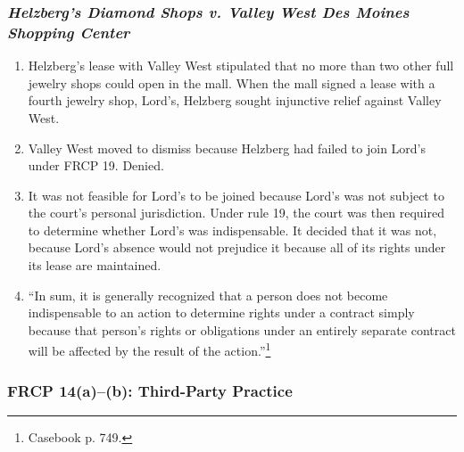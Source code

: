\subsubsection{\emph{Helzberg's Diamond Shops v. Valley West Des Moines Shopping Center}}

\begin{enumerate}
    \item Helzberg's lease with Valley West stipulated that no more than two other full jewelry shops could open in the mall. When the mall signed a lease with a fourth jewelry shop, Lord's, Helzberg sought injunctive relief against Valley West.
    \item Valley West moved to dismiss because Helzberg had failed to join Lord's under FRCP 19. Denied.
    \item It was not feasible for Lord's to be joined because Lord's was not subject to the court's personal jurisdiction. Under rule 19, the court was then required to determine whether Lord's was indispensable. It decided that it was not, because Lord's absence would not prejudice it because all of its rights under its lease are maintained.
    \item ``In sum, it is generally recognized that a person does not become indispensable to an action to determine rights under a contract simply because that person's rights or obligations under an entirely separate contract will be affected by the result of the action.''\footnote{Casebook p. 749.}
\end{enumerate}

\subsubsection{FRCP 14(a)--(b): Third-Party Practice}

